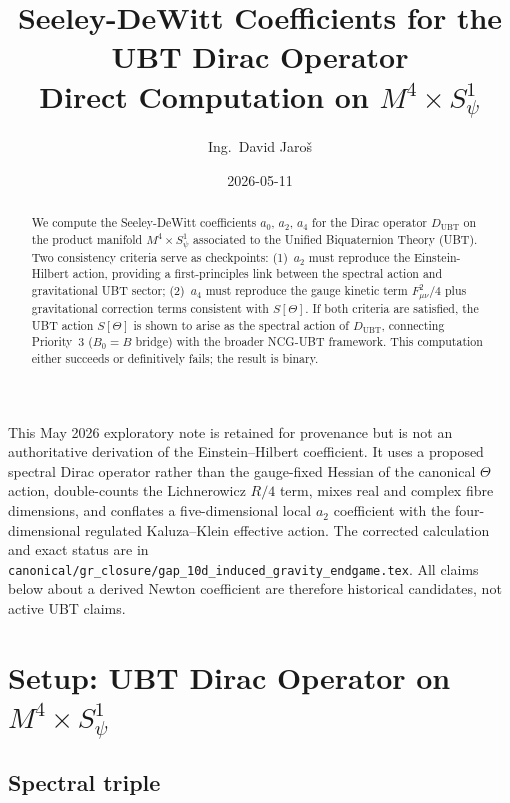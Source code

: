 \documentclass[12pt,a4paper]{article}
\title{\textbf{Seeley-DeWitt Coefficients for the UBT Dirac Operator}\\
{\large Direct Computation on $M^4\times S^1_\psi$}}
\author{Ing.\ David Jaro\v{s}}
\date{2026-05-11}
\theoremstyle{definition}
\theoremstyle{remark}
\begin{document}
\maketitle

\begin{tcolorbox}[colback=red!5!white,colframe=red!65!black,
 title={SUPERSEDED FOR THE GR COEFFICIENT}]
This May 2026 exploratory note is retained for provenance but is not an
authoritative derivation of the Einstein--Hilbert coefficient.  It uses a
proposed spectral Dirac operator rather than the gauge-fixed Hessian of the
canonical $\Theta$ action, double-counts the Lichnerowicz $R/4$ term, mixes
real and complex fibre dimensions, and conflates a five-dimensional local
$a_2$ coefficient with the four-dimensional regulated Kaluza--Klein effective
action.  The corrected calculation and exact status are in
\texttt{canonical/gr\_closure/gap\_10d\_induced\_gravity\_endgame.tex}.
All claims below about a derived Newton coefficient are therefore historical
candidates, not active UBT claims.
\end{tcolorbox}

\begin{abstract}
We compute the Seeley-DeWitt coefficients $a_0$, $a_2$, $a_4$ for the Dirac
operator $D_{\mathrm{UBT}}$ on the product manifold $M^4\times S^1_\psi$
associated to the Unified Biquaternion Theory (UBT).
Two consistency criteria serve as checkpoints: (1)~$a_2$ must reproduce the
Einstein-Hilbert action, providing a first-principles link between the spectral
action and gravitational UBT sector; (2)~$a_4$ must reproduce the gauge kinetic
term $F_{\mu\nu}^2/4$ plus gravitational correction terms consistent with
$S[\Theta]$.
If both criteria are satisfied, the UBT action $S[\Theta]$ is shown to arise as
the spectral action of $D_{\mathrm{UBT}}$, connecting Priority~3 ($B_0=B$ bridge)
with the broader NCG-UBT framework.
This computation either succeeds or definitively fails; the result is binary.
\end{abstract}

\section{Setup: UBT Dirac Operator on $M^4\times S^1_\psi$}
\label{sec:setup}

\subsection{Spectral triple}
\end{document}
